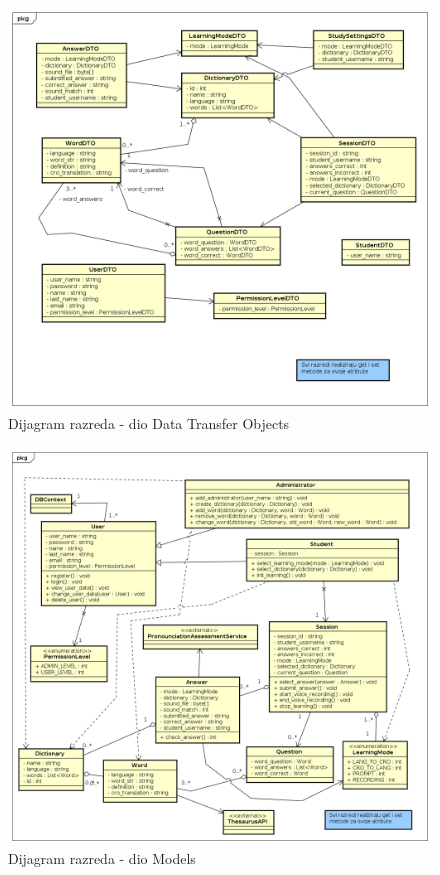			\begin{figure}[H]
				\includegraphics[width=\textwidth]{dijagrami/classdto.png} %
				\caption{Dijagram razreda - dio Data Transfer Objects}
				\label{fig:classdto} %
			\end{figure}

			\begin{figure}[H]
				\includegraphics[width=\textwidth]{dijagrami/classmodel.png} %
				\caption{Dijagram razreda - dio Models}
				\label{fig:classmodel} %
			\end{figure}
		
